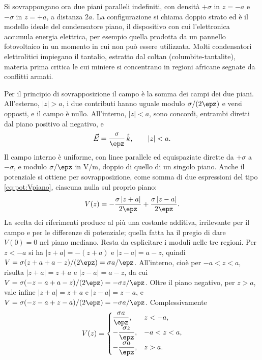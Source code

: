 \documentclass[main.tex]{subfiles}
\begin{document}
	Si sovrappongano ora due piani paralleli indefiniti, con densità $+\sigma$ in $z=-a$ e $-\sigma$ in $z=+a$, a distanza $2a$. La configurazione si chiama doppio strato ed è il modello ideale del condensatore piano, il dispositivo con cui l'elettronica accumula energia elettrica, per esempio quella prodotta da un pannello fotovoltaico in un momento in cui non può essere utilizzata. Molti condensatori elettrolitici impiegano il tantalio, estratto dal coltan (columbite-tantalite), materia prima critica le cui miniere si concentrano in regioni africane segnate da conflitti armati.
	
	Per il principio di sovrapposizione il campo è la somma dei campi dei due piani. All'esterno, $|z|>a$, i due contributi hanno uguale modulo $\sigma/(2\epz)$ e versi opposti, e il campo è nullo. All'interno, $|z|<a$, sono concordi, entrambi diretti dal piano positivo al negativo, e
	\[
	\vec E=\frac{\sigma}{\epz}\,\hat k ,\qquad |z|<a .
	\]
	Il campo interno è uniforme, con linee parallele ed equispaziate dirette da $+\sigma$ a $-\sigma$, e modulo $\sigma/\epz$ in $\mathrm{V/m}$, doppio di quello di un singolo piano. Anche il potenziale si ottiene per sovrapposizione, come somma di due espressioni del tipo \eqref{eq:pot:Vpiano}, ciascuna nulla sul proprio piano:
	\[
	V(z)=-\frac{\sigma\,|z+a|}{2\epz}+\frac{\sigma\,|z-a|}{2\epz}.
	\]
	La scelta dei riferimenti produce al più una costante additiva, irrilevante per il campo e per le differenze di potenziale; quella fatta ha il pregio di dare $V(0)=0$ nel piano mediano. Resta da esplicitare i moduli nelle tre regioni. Per $z<-a$ si ha $|z+a|=-(z+a)$ e $|z-a|=a-z$, quindi $V=\sigma(z+a+a-z)/(2\epz)=\sigma a/\epz$. All'interno, cioè per $-a<z<a$, risulta $|z+a|=z+a$ e $|z-a|=a-z$, da cui $V=\sigma(-z-a+a-z)/(2\epz)=-\sigma z/\epz$. Oltre il piano negativo, per $z>a$, vale infine $|z+a|=z+a$ e $|z-a|=z-a$, e $V=\sigma(-z-a+z-a)/(2\epz)=-\sigma a/\epz$. Complessivamente
	\[
	V(z)=\begin{cases}
		\dfrac{\sigma a}{\epz}, & z<-a,\\[2mm]
		-\dfrac{\sigma z}{\epz}, & -a<z<a,\\[2mm]
		-\dfrac{\sigma a}{\epz}, & z>a.
	\end{cases}
	\]
	
\end{document}
